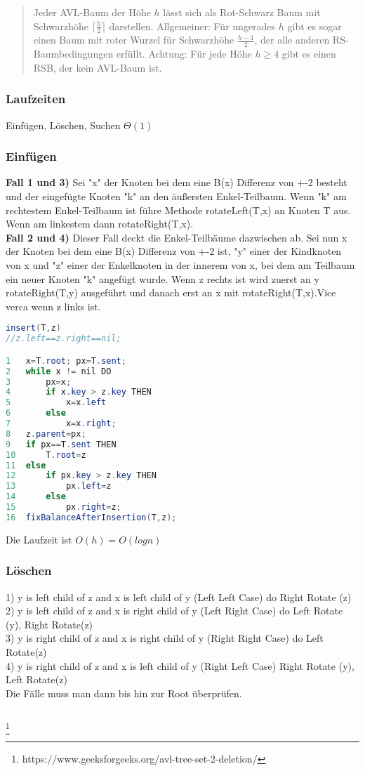 \documentclass[jou,apacite]{apa6}
\begin{document}
\begin{quote}
    Jeder AVL-Baum der Höhe $h$ lässt sich als Rot-Schwarz Baum mit Schwarzhöhe ${\lceil{\frac{h}{2}}}\rceil$ darstellen. Allgemeiner: Für ungerades $h$ gibt es sogar einen Baum mit roter Wurzel für Schwarzhöhe $\frac{h-1}{2}$, der alle anderen RS-Baumbedingungen erfüllt. Achtung: Für jede Höhe $h \geq 4$ gibt es einen RSB, der kein AVL-Baum ist.
\end{quote}
\subsubsection{Laufzeiten}
Einfügen, Löschen, Suchen  $\Theta(1)$
\subsubsection{Einfügen}
{\bfseries Fall 1 und 3)} 
Sei "x" der Knoten bei dem eine B(x) Differenz von +-2 besteht und der eingefügte Knoten "k" an den äußersten Enkel-Teilbaum. Wenn "k" am rechtestem Enkel-Teilbaum ist führe Methode rotateLeft(T,x) an Knoten T aus. Wenn am linkestem dann rotateRight(T,x). \\
{\bfseries Fall 2 und 4)} 
Dieser Fall deckt die Enkel-Teilbäume dazwischen ab. Sei nun x der Knoten bei dem eine B(x) Differenz von +-2 ist, "y" einer der Kindknoten von x und "z" einer der Enkelknoten in der innerem von x, bei dem am Teilbaum ein neuer Knoten "k" angefügt wurde. Wenn z rechts ist wird zuerst an y rotateRight(T,y) ausgeführt und danach erst an x mit rotateRight(T,x).Vice verca wenn z links ist.
\begin{lstlisting}[language=java]
insert(T,z)
//z.left==z.right==nil;

1   x=T.root; px=T.sent;
2   while x != nil DO
3       px=x;
4       if x.key > z.key THEN
5           x=x.left
6       else
7           x=x.right;
8   z.parent=px;
9   if px==T.sent THEN
10      T.root=z
11  else
12      if px.key > z.key THEN
13          px.left=z
14      else
15          px.right=z;
16  fixBalanceAfterInsertion(T,z);
\end{lstlisting}
Die Laufzeit ist $O(h) = O(log n)$
\subsubsection{Löschen \\}
1) y is left child of z and x is left child of y (Left Left Case) do
Right Rotate (z) \\
2) y is left child of z and x is right child of y (Left Right Case) do
Left Rotate (y), Right Rotate(z) \\
3) y is right child of z and x is right child of y (Right Right Case) do
Left Rotate(z) \\
4) y is right child of z and x is left child of y (Right Left Case)
Right Rotate (y), Left Rotate(z) \\
Die Fälle muss man dann bis hin zur Root überprüfen.
\begin{lstlisting}[language=java]

\end{lstlisting}
\footnote{https://www.geeksforgeeks.org/avl-tree-set-2-deletion/}
\end{document}
